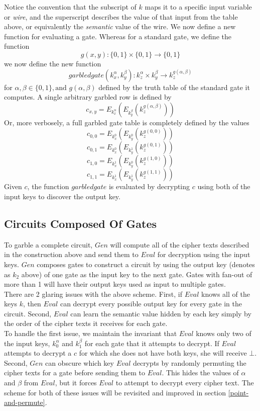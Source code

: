 \documentclass{article}
\begin{document}
Notice the convention that the subscript of $k$ maps it to a specific input variable or \textit{wire}, and the superscript describes the value of that input from the table above, or equivalently the \textit{semantic} value of the wire. We now define a new function for evaluating a gate. Whereas for a standard gate, we define the function $$g(x,y) : \{0,1\} \times \{0,1\} \rightarrow \{0,1\}$$
we now define the new function
$$garbledgate(k_{x}^{\alpha}, k_{y}^{\beta}) : k_{z}^{\alpha} \times k_{y}^{\beta} \rightarrow k_{z}^{g(\alpha,\beta)}$$
for $\alpha, \beta \in \{0,1\}, \text{and } g(\alpha,\beta)$ defined by the truth table of the standard gate it computes.
A single arbitrary garbled row is defined by $$ c_{x,y} = E_{k_{x}^{\alpha}}(E_{k_{y}^{\beta}}(k_{z}^{g(\alpha,\beta)}))$$ Or, more verbosely, a full garbled gate table is completely defined by the values \\
$$ c_{0,0} = E_{k_{x}^{0}}(E_{k_{y}^{0}}(k_{z}^{g(0,0)}))$$
$$ c_{0,1} = E_{k_{x}^{0}}(E_{k_{y}^{1}}(k_{z}^{g(0,1)}))$$
$$ c_{1,0} = E_{k_{x}^{1}}(E_{k_{y}^{0}}(k_{z}^{g(1,0)}))$$
$$ c_{1,1} = E_{k_{x}^{1}}(E_{k_{y}^{1}}(k_{z}^{g(1,1)}))$$
Given $c$, the function $garbledgate$ is evaluated by decrypting $c$ using both of the input keys to discover the output key. 


\subsection{Circuits Composed Of Gates}
\label{circuit-compose}

To garble a complete circuit, $Gen$ will compute all of the cipher texts described in the construction above and send them to $Eval$ for decryption using the input keys. $Gen$ composes gates to construct a circuit by using the output key (denotes as $k_2$ above) of one gate as the input key to the next gate. Gates with fan-out of more than 1 will have their output keys used as input to multiple gates. \\

There are 2 glaring issues with the above scheme. First, if $Eval$ knows all of the keys $k$, then $Eval$ can decrypt every possible output key for every gate in the circuit. Second, $Eval$ can learn the semantic value hidden by each key simply by the order of the cipher texts it receives for each gate.  \\

To handle the first issue, we maintain the invariant that $Eval$ knows only two of the input keys, $k_0^{\alpha}$ and $k_1^{\beta}$ for each gate that it attempts to decrypt. If $Eval$ attempts to decrypt a $c$ for which she does not have both keys, she will receive $\bot$. Second, $Gen$ can obscure which key $Eval$ decrypts by randomly permuting the cipher texts for a gate before sending them to $Eval$. This hides the values of $\alpha$ and $\beta$ from $Eval$, but it forces $Eval$ to attempt to decrypt every cipher text. The scheme for both of these issues will be revisited and improved in section \ref{point-and-permute}.
\end{document}
